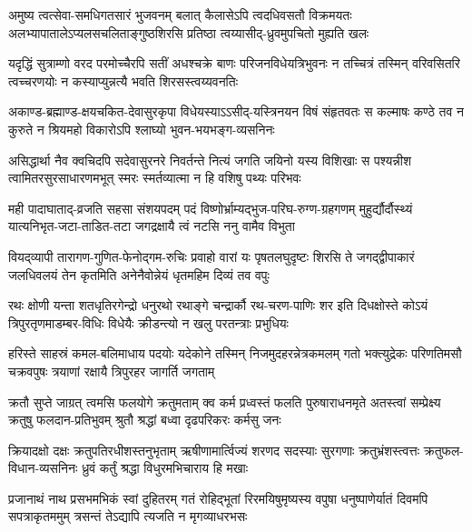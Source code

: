 \fourlineindentedshloka
{अमुष्य त्वत्सेवा-समधिगतसारं भुजवनम्}
{बलात् कैलासेऽपि त्वदधिवसतौ विक्रमयतः}
{अलभ्यापातालेऽप्यलसचलिताङ्गुष्ठशिरसि}
{प्रतिष्ठा त्वय्यासीद्-ध्रुवमुपचितो मुह्यति खलः}%

\fourlineindentedshloka
{यदृद्धिं सुत्राम्णो वरद परमोच्चैरपि सतीं}
{अधश्चक्रे बाणः परिजनविधेयत्रिभुवनः}
{न तच्चित्रं तस्मिन् वरिवसितरि त्वच्चरणयोः}
{न कस्याप्युन्नत्यै भवति शिरसस्त्वय्यवनतिः}%

\fourlineindentedshloka
{अकाण्ड-ब्रह्माण्ड-क्षयचकित-देवासुरकृपा}
{विधेयस्याऽऽसीद्-यस्त्रिनयन विषं संहृतवतः}
{स कल्माषः कण्ठे तव न कुरुते न श्रियमहो}
{विकारोऽपि श्लाघ्यो भुवन-भयभङ्ग-व्यसनिनः}%

\fourlineindentedshloka
{असिद्धार्था नैव क्वचिदपि सदेवासुरनरे}
{निवर्तन्ते नित्यं जगति जयिनो यस्य विशिखाः}
{स पश्यन्नीश त्वामितरसुरसाधारणमभूत्}
{स्मरः स्मर्तव्यात्मा न हि वशिषु पथ्यः परिभवः}%

\fourlineindentedshloka
{मही पादाघाताद्-व्रजति सहसा संशयपदम्}
{पदं विष्णोर्भ्राम्यद्भुज-परिघ-रुग्ण-ग्रहगणम्}
{मुहुर्द्यौर्दौस्थ्यं यात्यनिभृत-जटा-ताडित-तटा}
{जगद्रक्षायै त्वं नटसि ननु वामैव विभुता}%

\fourlineindentedshloka
{वियद्‍व्यापी तारागण-गुणित-फेनोद्गम-रुचिः}
{प्रवाहो वारां यः पृषतलघुदृष्टः शिरसि ते}
{जगद्द्वीपाकारं जलधिवलयं तेन कृतमिति}
{अनेनैवोन्नेयं धृतमहिम दिव्यं तव वपुः}%

\fourlineindentedshloka
{रथः क्षोणी यन्ता शतधृतिरगेन्द्रो धनुरथो}
{रथाङ्गे चन्द्रार्कौ रथ-चरण-पाणिः शर इति}
{दिधक्षोस्ते कोऽयं त्रिपुरतृणमाडम्बर-विधिः}
{विधेयैः क्रीडन्त्यो न खलु परतन्त्राः प्रभुधियः}%

\fourlineindentedshloka
{हरिस्ते साहस्रं कमल-बलिमाधाय पदयोः}
{यदेकोने तस्मिन् निजमुदहरन्नेत्रकमलम्}
{गतो भक्त्युद्रेकः परिणतिमसौ चक्रवपुषः}
{त्रयाणां रक्षायै त्रिपुरहर  जागर्ति जगताम्}%

\fourlineindentedshloka
{क्रतौ सुप्ते जाग्रत् त्वमसि फलयोगे क्रतुमताम्}
{क्व कर्म प्रध्वस्तं फलति पुरुषाराधनमृते}
{अतस्त्वां सम्प्रेक्ष्य क्रतुषु फलदान-प्रतिभुवम्}
{श्रुतौ श्रद्धां बध्वा दृढपरिकरः कर्मसु जनः}%

\fourlineindentedshloka
{क्रियादक्षो दक्षः क्रतुपतिरधीशस्तनुभृताम्}
{ऋषीणामार्त्विज्यं शरणद सदस्याः सुरगणाः}
{क्रतुभ्रंशस्त्वत्तः क्रतुफल-विधान-व्यसनिनः}
{ध्रुवं कर्तुं श्रद्धा विधुरमभिचाराय हि मखाः}%

\fourlineindentedshloka
{प्रजानाथं नाथ प्रसभमभिकं स्वां दुहितरम्}
{गतं रोहिद्भूतां रिरमयिषुमृष्यस्य वपुषा}
{धनुष्पाणेर्यातं दिवमपि सपत्राकृतममुम्}
{त्रसन्तं तेऽद्यापि त्यजति न मृगव्याधरभसः}%

